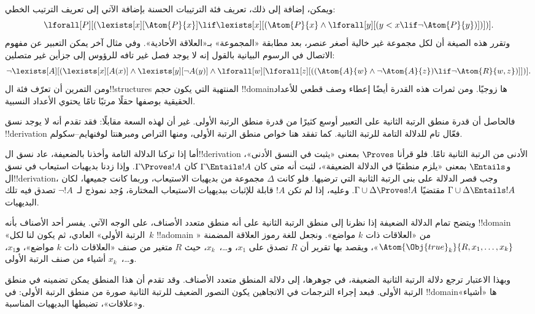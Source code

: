 \documentclass[../../../include/open-logic-section]{subfiles}
\begin{document}
ويمكن، إضافة إلى ذلك، تعريف فئة الترتيبات الحسنة بإضافة الآتي إلى
تعريف الترتيب الخطي:
\[
\lforall[P][(\lexists[x][\Atom{P}{x}] \lif \lexists[x][(\Atom{P}{x}
    \land \lforall[y][(y < x \lif \lnot \Atom{P}{y})])])].
\]
وتقرر هذه الصيغة أن لكل مجموعة غير خالية أصغر عنصر، بعد مطابقة
«المجموعة» بـ«العلاقة الأحادية». وفي مثال آخر يمكن التعبير عن مفهوم
الاتصال في الرسوم البيانية بالقول إنه لا يوجد فصل غير تافه للرؤوس إلى
جزأين غير متصلين:
\[
\lnot \lexists[A][(\lexists[x][A(x)] \land \lexists[y][\lnot A(y)]
  \land \lforall[w][\lforall[z][((\Atom{A}{w} \land \lnot \Atom{A}{z})
      \lif \lnot \Atom{R}{w,z})]])].
\]
ومن التمرين أن تعرّف فئة ال!!{structure}s
المنتهية التي يكون حجم !!{domain}ها زوجيًا. ومن ثمرات هذه القدرة أيضًا إعطاء
وصف قطعي للأعداد الحقيقية بوصفها حقلًا مرتبًا تامًا يحتوي الأعداد
النسبية.

فالحاصل أن قدرة منطق الرتبة الثانية على التعبير أوسع كثيرًا
من قدرة منطق الرتبة الأولى. غير أن لهذه السعة مقابلًا: فقد
تقدم أنه لا يوجد نسق !!{derivation} فعّال تام للدلالة التامة
للرتبة الثانية. كما تفقد هنا خواص منطق الرتبة الأولى، ومنها
التراص ومبرهنتا لوفنهايم--سكولم.

أما إذا تركنا الدلالة التامة وأخذنا بالضعيفة، عاد نسق
ال!!{derivation} الأدنى من الرتبة الثانية تامًا. فلو قرأنا
$\Proves$ بمعنى «يثبت في النسق الأدنى»، و$\Entails$ بمعنى
«يلزم منطقيًا في الدلالة الضعيفة»، لثبت أنه متى كان
$\Gamma \Entails !A$ كان $\Gamma \Proves
!A$. وإذا زدنا بديهيات استيعاب في نسق ال!!{derivation}، وجب
قصر الدلالة على بنى الرتبة الثانية التي ترضيها. فلو كانت
$\Delta$ مجموعة من بديهيات الاستيعاب، وربما كانت جميعها، لكان
$\Gamma \cup \Delta \Entails
!A$ مقتضيًا $\Gamma \cup \Delta \Proves !A$.
وعليه، إذا لم تكن $!A$ قابلة للإثبات ببديهيات الاستيعاب
المختارة، وُجد نموذج لـ~$\lnot !A$ تصدق فيه تلك البديهيات.

ويتضح تمام الدلالة الضعيفة إذا نظرنا إلى منطق الرتبة الثانية
على أنه منطق متعدد الأصناف، على الوجه الآتي.
يفسر أحد الأصناف بأنه !!{domain} «الرتبة الأولى» العادي، ثم يكون لنا
لكل~$k$ !!a{domain} من «العلاقات ذات $k$ مواضع». ونجعل للغة رموز
العلاقة المضمنة «$\Atom{\Obj{true}_k}{R,x_1,\dots,x_k}$»، ويقصد بها
تقرير أن $R$ تصدق على $x_1$، و\dots،~$x_k$، حيث $R$ متغير من صنف
«العلاقات ذات $k$ مواضع»، و$x_1$، و\dots،~$x_k$ أشياء من صنف الرتبة
الأولى.

وبهذا الاعتبار ترجع دلالة الرتبة الثانية الضعيفة، في جوهرها،
إلى دلالة المنطق متعدد الأصناف. وقد تقدم أن هذا المنطق يمكن
تضمينه في منطق الرتبة الأولى. فبعد إجراء الترجمات في الاتجاهين
يكون التصور الضعيف للرتبة الثانية صورة من منطق الرتبة الأولى:
في !!{domain}ها «أشياء» و«علاقات»، تضبطها البديهيات المناسبة.
\end{document}
